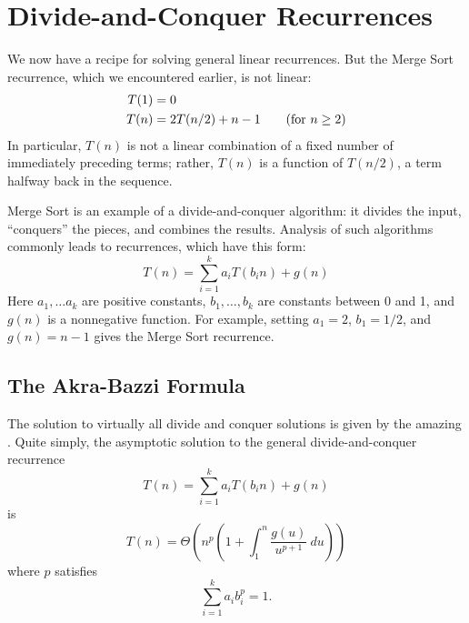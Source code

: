 \begin{figure}[p]
\end{figure}

\section{Divide-and-Conquer Recurrences}

We now have a recipe for solving general linear recurrences.  But the
Merge Sort recurrence, which we encountered earlier, is not linear:
\begin{align*}
T(1) & = 0 \\
T(n) & = 2 T(n/2) + n - 1 \text{\qquad (for $n \geq 2$)}
\end{align*}
In particular, $T(n)$ is not a linear combination of a fixed number of
immediately preceding terms; rather, $T(n)$ is a function of $T(n/2)$,
a term halfway back in the sequence.

Merge Sort is an example of a divide-and-conquer algorithm: it divides
the input, ``conquers'' the pieces, and combines the results.
Analysis of such algorithms commonly leads to 
recurrences, which have this form:
\begin{equation*}
T(n) =
 \sum_{i=1}^k a_i T(b_i n) + g(n)
\end{equation*}
Here $a_1, \ldots a_k$ are positive constants, $b_1, \ldots, b_k$ are
constants between 0 and 1, and $g(n)$ is a nonnegative function.  For
example, setting $a_1 = 2$, $b_1 = 1/2$, and $g(n) = n - 1$ gives the
Merge Sort recurrence.

\subsection{The Akra-Bazzi Formula}

The solution to virtually all divide and conquer solutions is given by
the amazing .  Quite simply, the asymptotic
solution to the general divide-and-conquer recurrence
\begin{equation*}
T(n) =
 \sum_{i=1}^k a_i T(b_i n) + g(n)
\end{equation*}
is
\begin{equation}\label{eqn:10C1}
T(n) = \Theta\left(
n^p \left(1 + \int_1^n \frac{g(u)}{u^{p+1}}\ du\right)
\right)
\end{equation}\label{eqn:10C2}
where $p$ satisfies
\begin{equation}
\sum_{i=1}^k {a_i b_i^p} = 1.
\end{equation}

